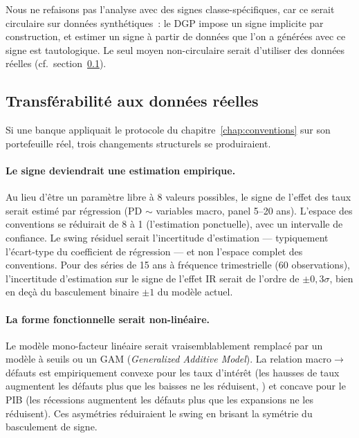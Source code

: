 \documentclass[12pt, a4paper, twoside, openright]{report}
\theoremstyle{definition}
\begin{document}
Nous ne refaisons pas l'analyse avec des signes classe-spécifiques, car ce serait circulaire sur données synthétiques~: le DGP impose un signe implicite par construction, et estimer un signe à partir de données que l'on a générées avec ce signe est tautologique. Le seul moyen non-circulaire serait d'utiliser des données réelles (cf.\ section~\ref{sec:conv-transferabilite}).


\subsection{Transférabilité aux données réelles}
\label{sec:conv-transferabilite}

Si une banque appliquait le protocole du chapitre~\ref{chap:conventions} sur son portefeuille réel, trois changements structurels se produiraient.

\paragraph{Le signe deviendrait une estimation empirique.}
Au lieu d'être un paramètre libre à 8 valeurs possibles, le signe de l'effet des taux serait estimé par régression (PD $\sim$ variables macro, panel 5--20 ans). L'espace des conventions se réduirait de 8 à 1 (l'estimation ponctuelle), avec un intervalle de confiance. Le swing résiduel serait l'incertitude d'estimation --- typiquement l'écart-type du coefficient de régression --- et non l'espace complet des conventions. Pour des séries de 15 ans à fréquence trimestrielle (60 observations), l'incertitude d'estimation sur le signe de l'effet IR serait de l'ordre de $\pm 0{,}3\sigma$, bien en deçà du basculement binaire $\pm 1$ du modèle actuel.

\paragraph{La forme fonctionnelle serait non-linéaire.}
Le modèle mono-facteur linéaire serait vraisemblablement remplacé par un modèle à seuils ou un GAM (\textit{Generalized Additive Model}). La relation macro$\to$défauts est empiriquement convexe pour les taux d'intérêt (les hausses de taux augmentent les défauts plus que les baisses ne les réduisent, \citealt{duffie2007}) et concave pour le PIB (les récessions augmentent les défauts plus que les expansions ne les réduisent). Ces asymétries réduiraient le swing en brisant la symétrie du basculement de signe.
\end{document}
